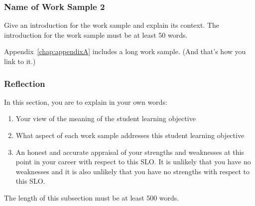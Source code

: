 \subsubsection{Name of Work Sample 2}
Give an introduction for the work sample and explain its context.  The
introduction for the work sample must be at least 50 words.

Appendix~\ref{chap:appendixA} includes a long work sample.  (And that's how you
link to it.)

\subsubsection{Reflection}
In this section, you are to explain in your own words:
\begin{enumerate}
\item Your view of the meaning of the student learning objective
\item What aspect of each work sample addresses this student learning
      objective
\item An honest and accurate appraisal of your strengths and weaknesses at
      this point in your career with respect to this SLO.  It is unlikely
      that you have no weaknesses and it is also unlikely that you have no
      strengths with respect to this SLO.
\end{enumerate}

The length of this subsection must be at least 500 words.
